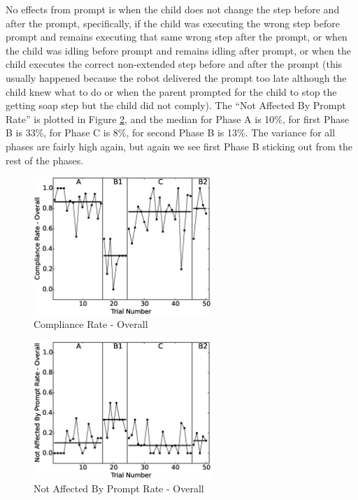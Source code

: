 No effects from prompt is when the child does not change the step before and after the prompt, specifically, if the child was executing the wrong step before prompt and remains executing that same wrong step after the prompt, or when the child was idling before prompt and remains idling after prompt, or when the child executes the correct non-extended step before and after the prompt (this usually happened because the robot delivered the prompt too late although the child knew what to do or when the parent prompted for the child to stop the getting soap step but the child did not comply).  The ``Not Affected By Prompt Rate'' is plotted in Figure \ref{fig:1NotAffectedByPromptRate-Overall}, and the median for Phase A is 10\%, for first Phase B is 33\%, for Phase C is 8\%, for second Phase B is 13\%.  The variance for all phases are fairly high again, but again we see first Phase B sticking out from the rest of the phases.
\begin{figure} [h]
	\centering
	\includegraphics[width=0.6\textwidth]{./img/data_analysis/4ComplianceRate-Overall.eps}
	\caption{Compliance Rate - Overall}
	\label{fig:4ComplianceRate-Overall}
\end{figure}
\begin{figure} [h]
	\centering
	\includegraphics[width=0.6\textwidth]{./img/data_analysis/1NotAffectedByPromptRate-Overall.eps}
	\caption{Not Affected By Prompt Rate - Overall}
	\label{fig:1NotAffectedByPromptRate-Overall}
\end{figure}


